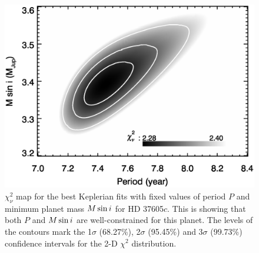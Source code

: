 \begin{figure}
\includegraphics[scale=0.6]{37605/f2.eps} 
\caption{$\chi^2_{\nu}$ map for the best Keplerian fits with fixed
  values of period $P$ and minimum planet mass $M\sin{i}$ for HD
  37605$c$. This is showing that both $P$ and $M\sin{i}$ are
  well-constrained for this planet. The levels of the contours mark
  the 1$\sigma$ (68.27\%), 2$\sigma$ (95.45\%) and 3$\sigma$
  (99.73\%) confidence intervals for the 2-D $\chi^2$ distribution.\label{mmperplot}}
\end{figure}



